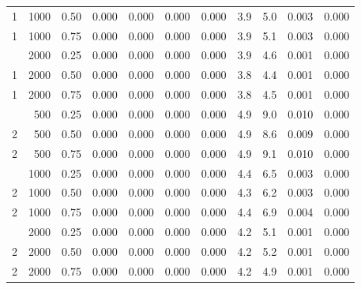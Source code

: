 \begin{table}[t]
\begin{tabular}{rrr rr rr rr rr}
1 & 1000 & 0.50 & 0.000 & 0.000 & 0.000 & 0.000 & 3.9 & 5.0 & 0.003 & 0.000 \\
1 & 1000 & 0.75 & 0.000 & 0.000 & 0.000 & 0.000 & 3.9 & 5.1 & 0.003 & 0.000 \\
\addlinespace
1 & 2000 & 0.25 & 0.000 & 0.000 & 0.000 & 0.000 & 3.9 & 4.6 & 0.001 & 0.000 \\
1 & 2000 & 0.50 & 0.000 & 0.000 & 0.000 & 0.000 & 3.8 & 4.4 & 0.001 & 0.000 \\
1 & 2000 & 0.75 & 0.000 & 0.000 & 0.000 & 0.000 & 3.8 & 4.5 & 0.001 & 0.000 \\
\addlinespace
2 & 500 & 0.25 & 0.000 & 0.000 & 0.000 & 0.000 & 4.9 & 9.0 & 0.010 & 0.000 \\
2 & 500 & 0.50 & 0.000 & 0.000 & 0.000 & 0.000 & 4.9 & 8.6 & 0.009 & 0.000 \\
2 & 500 & 0.75 & 0.000 & 0.000 & 0.000 & 0.000 & 4.9 & 9.1 & 0.010 & 0.000 \\
\addlinespace
2 & 1000 & 0.25 & 0.000 & 0.000 & 0.000 & 0.000 & 4.4 & 6.5 & 0.003 & 0.000 \\
2 & 1000 & 0.50 & 0.000 & 0.000 & 0.000 & 0.000 & 4.3 & 6.2 & 0.003 & 0.000 \\
2 & 1000 & 0.75 & 0.000 & 0.000 & 0.000 & 0.000 & 4.4 & 6.9 & 0.004 & 0.000 \\
\addlinespace
2 & 2000 & 0.25 & 0.000 & 0.000 & 0.000 & 0.000 & 4.2 & 5.1 & 0.001 & 0.000 \\
2 & 2000 & 0.50 & 0.000 & 0.000 & 0.000 & 0.000 & 4.2 & 5.2 & 0.001 & 0.000 \\
2 & 2000 & 0.75 & 0.000 & 0.000 & 0.000 & 0.000 & 4.2 & 4.9 & 0.001 & 0.000 \\
\bottomrule\end{tabular}\end{table}
